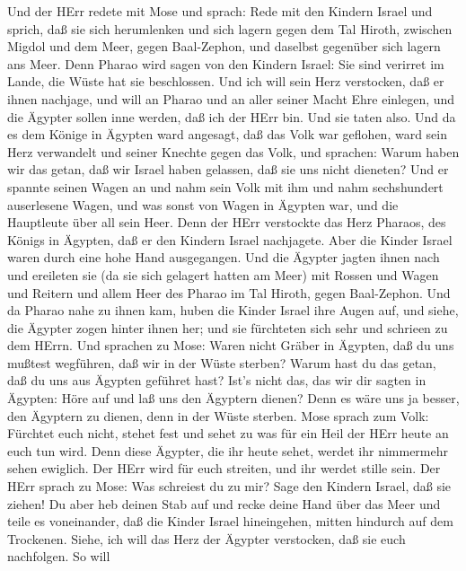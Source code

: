  Und der HErr redete mit Mose und sprach:  Rede
mit den Kindern Israel und sprich, daß sie sich herumlenken und sich
lagern gegen dem Tal Hiroth, zwischen Migdol und dem Meer, gegen
Baal-Zephon, und daselbst gegenüber sich lagern ans Meer. 
Denn Pharao wird sagen von den Kindern Israel: Sie sind verirret im
Lande, die Wüste hat sie beschlossen.  Und ich will sein
Herz verstocken, daß er ihnen nachjage, und will an Pharao und an aller
seiner Macht Ehre einlegen, und die Ägypter sollen inne werden, daß ich
der HErr bin. Und sie taten also.  Und da es dem Könige in
Ägypten ward angesagt, daß das Volk war geflohen, ward sein Herz
verwandelt und seiner Knechte gegen das Volk, und sprachen: Warum haben
wir das getan, daß wir Israel haben gelassen, daß sie uns nicht
dieneten?  Und er spannte seinen Wagen an und nahm sein Volk
mit ihm  und nahm sechshundert auserlesene Wagen, und was
sonst von Wagen in Ägypten war, und die Hauptleute über all sein Heer.
 Denn der HErr verstockte das Herz Pharaos, des Königs in
Ägypten, daß er den Kindern Israel nachjagete. Aber die Kinder Israel
waren durch eine hohe Hand ausgegangen.  Und die Ägypter
jagten ihnen nach und ereileten sie (da sie sich gelagert hatten am
Meer) mit Rossen und Wagen und Reitern und allem Heer des Pharao im Tal
Hiroth, gegen Baal-Zephon.  Und da Pharao nahe zu ihnen
kam, huben die Kinder Israel ihre Augen auf, und siehe, die Ägypter
zogen hinter ihnen her; und sie fürchteten sich sehr und schrieen zu dem
HErrn.  Und sprachen zu Mose: Waren nicht Gräber in
Ägypten, daß du uns mußtest wegführen, daß wir in der Wüste sterben?
Warum hast du das getan, daß du uns aus Ägypten geführet hast?
 Ist's nicht das, das wir dir sagten in Ägypten: Höre auf
und laß uns den Ägyptern dienen? Denn es wäre uns ja besser, den
Ägyptern zu dienen, denn in der Wüste sterben.  Mose sprach
zum Volk: Fürchtet euch nicht, stehet fest und sehet zu was für ein Heil
der HErr heute an euch tun wird. Denn diese Ägypter, die ihr heute
sehet, werdet ihr nimmermehr sehen ewiglich.  Der HErr wird
für euch streiten, und ihr werdet stille sein.  Der HErr
sprach zu Mose: Was schreiest du zu mir? Sage den Kindern Israel, daß
sie ziehen!  Du aber heb deinen Stab auf und recke deine
Hand über das Meer und teile es voneinander, daß die Kinder Israel
hineingehen, mitten hindurch auf dem Trockenen.  Siehe, ich
will das Herz der Ägypter verstocken, daß sie euch nachfolgen. So will
